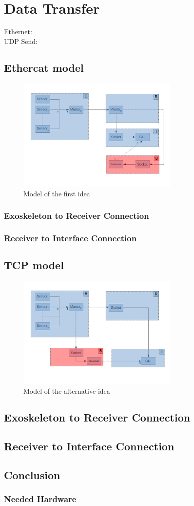 \section{Data Transfer}
Ethernet: \cite{web:ethernet}\\
UDP Send: \cite{web:UDPSend}


\subsection{Ethercat model}
\begin{figure}[H]
	\centering
	\includegraphics[width=300px]{ERBI-Model-EtherCat}
	\caption{Model of the first idea}
	\label{img:orgidea}
\end{figure}

\subsubsection{Exoskeleton to Receiver Connection}
\subsubsection{Receiver to Interface Connection}


\subsection{TCP model}
\begin{figure}[H]
	\centering
	\includegraphics[width=300px]{ERBI-Model-TCP}
	\caption{Model of the alternative idea}
	\label{img:altidea}
\end{figure}
	
\subsection{Exoskeleton to Receiver Connection}
\subsection{Receiver to Interface Connection}	


\subsection{Conclusion}
\subsubsection{Needed Hardware}
% 